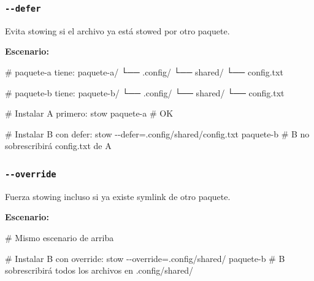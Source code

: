 \documentclass[
  doc,
  floatsintext,
  longtable,
  a4paper,
  nolmodern,
  notxfonts,
  notimes,
  12pt,
  colorlinks=true,linkcolor=blue,citecolor=blue,urlcolor=blue]{apa7}
\newenvironment{Shaded}{\begin{snugshade}}{\end{snugshade}}
\newcommand{\AttributeTok}[1]{\textcolor[rgb]{0.40,0.45,0.13}{#1}}
\newcommand{\CommentTok}[1]{\textcolor[rgb]{0.37,0.37,0.37}{#1}}
\newcommand{\ExtensionTok}[1]{\textcolor[rgb]{0.00,0.23,0.31}{#1}}
\newcommand{\NormalTok}[1]{\textcolor[rgb]{0.00,0.23,0.31}{#1}}
\newcommand{\OperatorTok}[1]{\textcolor[rgb]{0.37,0.37,0.37}{#1}}
\newcommand{\StringTok}[1]{\textcolor[rgb]{0.13,0.47,0.30}{#1}}
\begin{document}
\subsubsection{\texorpdfstring{\texttt{-\/-defer}}{-\/-defer}}\label{defer}

Evita stowing si el archivo ya está stowed por otro paquete.

\textbf{Escenario:}

\begin{Shaded}
\begin{Highlighting}[]
\CommentTok{\# paquete{-}a tiene:}
\ExtensionTok{paquete{-}a/}
  \ExtensionTok{└──}\NormalTok{ .config/}
      \ExtensionTok{└──}\NormalTok{ shared/}
          \ExtensionTok{└──}\NormalTok{ config.txt}

\CommentTok{\# paquete{-}b tiene:}
\ExtensionTok{paquete{-}b/}
  \ExtensionTok{└──}\NormalTok{ .config/}
      \ExtensionTok{└──}\NormalTok{ shared/}
          \ExtensionTok{└──}\NormalTok{ config.txt}

\CommentTok{\# Instalar A primero:}
\ExtensionTok{stow}\NormalTok{ paquete{-}a  }\CommentTok{\# OK}

\CommentTok{\# Instalar B con defer:}
\ExtensionTok{stow} \AttributeTok{{-}{-}defer}\OperatorTok{=}\StringTok{\textquotesingle{}.config/shared/config.txt\textquotesingle{}}\NormalTok{ paquete{-}b}
\CommentTok{\# B no sobrescribirá config.txt de A}
\end{Highlighting}
\end{Shaded}

\subsubsection{\texorpdfstring{\texttt{-\/-override}}{-\/-override}}\label{override}

Fuerza stowing incluso si ya existe symlink de otro paquete.

\textbf{Escenario:}

\begin{Shaded}
\begin{Highlighting}[]
\CommentTok{\# Mismo escenario de arriba}

\CommentTok{\# Instalar B con override:}
\ExtensionTok{stow} \AttributeTok{{-}{-}override}\OperatorTok{=}\StringTok{\textquotesingle{}.config/shared/\textquotesingle{}}\NormalTok{ paquete{-}b}
\CommentTok{\# B sobrescribirá todos los archivos en .config/shared/}
\end{Highlighting}
\end{Shaded}
\end{document}

